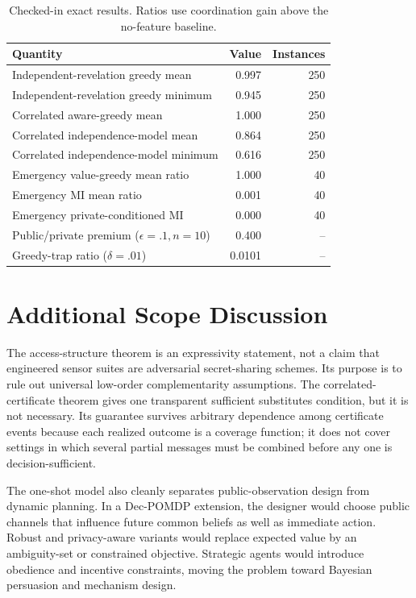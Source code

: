 \documentclass[11pt]{article}
\begin{document}
\begin{table}[h]
\centering
\begin{tabular}{lrr}
\toprule
Quantity & Value & Instances \\
\midrule
Independent-revelation greedy mean & 0.997 & 250 \\
Independent-revelation greedy minimum & 0.945 & 250 \\
Correlated aware-greedy mean & 1.000 & 250 \\
Correlated independence-model mean & 0.864 & 250 \\
Correlated independence-model minimum & 0.616 & 250 \\
Emergency value-greedy mean ratio & 1.000 & 40 \\
Emergency MI mean ratio & 0.001 & 40 \\
Emergency private-conditioned MI & 0.000 & 40 \\
Public/private premium ($\epsilon=.1,n=10$) & 0.400 & -- \\
Greedy-trap ratio ($\delta=.01$) & 0.0101 & -- \\
\bottomrule
\end{tabular}
\caption{Checked-in exact results. Ratios use coordination gain above the no-feature baseline.}
\end{table}

\section{Additional Scope Discussion}
The access-structure theorem is an expressivity statement, not a claim that engineered sensor suites are adversarial secret-sharing schemes. Its purpose is to rule out universal low-order complementarity assumptions. The correlated-certificate theorem gives one transparent sufficient substitutes condition, but it is not necessary. Its guarantee survives arbitrary dependence among certificate events because each realized outcome is a coverage function; it does not cover settings in which several partial messages must be combined before any one is decision-sufficient.

The one-shot model also cleanly separates public-observation design from dynamic planning. In a Dec-POMDP extension, the designer would choose public channels that influence future common beliefs as well as immediate action. Robust and privacy-aware variants would replace expected value by an ambiguity-set or constrained objective. Strategic agents would introduce obedience and incentive constraints, moving the problem toward Bayesian persuasion and mechanism design.



\end{document}

